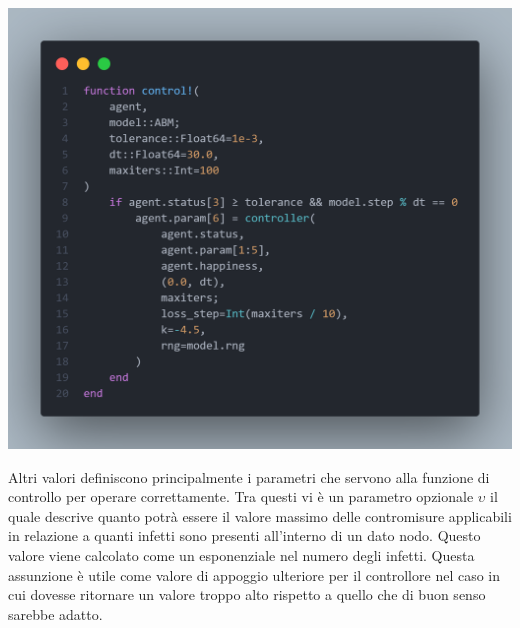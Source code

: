 \begin{minipage}{\linewidth}
	\centering
	\includegraphics[width=\textwidth]{img/controller_neuralode.png}
	\label{fig:controller_abm}
\end{minipage}

Altri valori definiscono principalmente i parametri che servono alla funzione di controllo per operare correttamente.
Tra questi vi è un parametro opzionale $\upsilon$ il quale descrive quanto potrà essere il valore massimo delle 
contromisure applicabili in relazione a quanti infetti sono presenti all'interno di un dato nodo. Questo valore viene 
calcolato come un esponenziale nel numero degli infetti. Questa assunzione è utile come valore di appoggio ulteriore 
per il controllore nel caso in cui dovesse ritornare un valore troppo alto rispetto a quello che di buon senso sarebbe 
adatto. 

